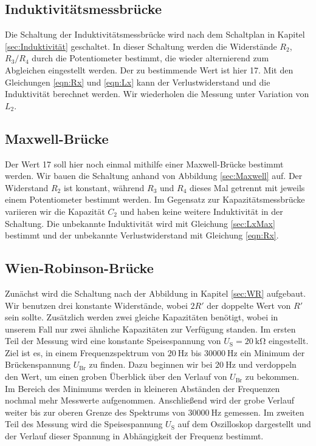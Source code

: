 \subsection{Induktivitätsmessbrücke}

    Die Schaltung der Induktivitätsmessbrücke wird nach dem Schaltplan in Kapitel \ref{sec:Induktivität} 
    geschaltet.
    In dieser Schaltung werden die Widerstände $R_2$, $R_3/R_4$ durch die Potentiometer bestimmt, die wieder 
    alternierend zum Abgleichen eingestellt werden.
    Der zu bestimmende Wert ist hier 17. 
    Mit den Gleichungen \eqref{eqn:Rx} und \eqref{eqn:Lx} kann der Verlustwiderstand und die Induktivität
    berechnet werden.
    Wir wiederholen die Messung unter Variation von $L_2$.

\subsection{Maxwell-Brücke}

    Der Wert 17 soll hier noch einmal mithilfe einer Maxwell-Brücke bestimmt werden.
    Wir bauen die Schaltung anhand von Abbildung \ref{sec:Maxwell} auf.
    Der Widerstand $R_2$ ist konstant, während $R_3$ und $R_4$ dieses Mal getrennt mit jeweils einem
    Potentiometer bestimmt werden.
    Im Gegensatz zur Kapazitätsmessbrücke variieren wir die Kapazität $C_2$ und haben keine weitere 
    Induktivität in der Schaltung.
    Die unbekannte Induktivität wird mit Gleichung \eqref{sec:LxMax} bestimmt und der unbekannte
    Verlustwiderstand mit Gleichung \eqref{eqn:Rx}.

\subsection{Wien-Robinson-Brücke}

    Zunächst wird die Schaltung nach der Abbildung in Kapitel \ref{sec:WR} aufgebaut.
    Wir benutzen drei konstante Widerstände, wobei $2R'$ der doppelte Wert von $R'$ sein sollte.
    Zusätzlich werden zwei gleiche Kapazitäten benötigt, wobei in unserem Fall nur zwei ähnliche Kapazitäten zur
    Verfügung standen.
    Im ersten Teil der Messung wird eine konstante Speisespannung von $U_\text{S} = \SI{20}{\kilo\ohm}$ eingestellt.
    Ziel ist es, in einem Frequenzspektrum von $\SI{20}{\hertz}$ bis $\SI{30000}{\hertz}$ ein 
    Minimum der Brückenspannung $U_\text{Br}$ zu finden.
    Dazu beginnen wir bei $\SI{20}{\hertz}$ und verdoppeln den Wert, um einen groben Überblick
    über den Verlauf von $U_\text{Br}$ zu bekommen. 
    Im Bereich des Minimums werden in kleineren Abständen der Frequenzen nochmal mehr Messwerte aufgenommen.
    Anschließend wird der grobe Verlauf weiter bis zur oberen Grenze des Spektrums von $\SI{30000}{\hertz}$ gemessen.
    Im zweiten Teil des Messung wird die Speisespannung $U_\text{S}$ auf dem Oszilloskop dargestellt 
    und der Verlauf dieser Spannung in Abhängigkeit der Frequenz bestimmt.
